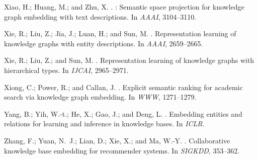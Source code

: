\documentclass[letterpaper]{article} \usepackage{aaai18}  \usepackage{times}  \usepackage{helvet}  \usepackage{courier}  \usepackage{url}  \usepackage{graphicx}  \usepackage{amsmath}
\begin{document}
\begin{thebibliography}{}
Xiao, H.; Huang, M.; and Zhu, X.
.
: Semantic space projection for knowledge graph embedding with
  text descriptions.
\newblock In {\em AAAI},  3104--3110.

Xie, R.; Liu, Z.; Jia, J.; Luan, H.; and Sun, M.
.
\newblock Representation learning of knowledge graphs with entity descriptions.
\newblock In {\em AAAI},  2659--2665.

Xie, R.; Liu, Z.; and Sun, M.
.
\newblock Representation learning of knowledge graphs with hierarchical types.
\newblock In {\em IJCAI},  2965--2971.

Xiong, C.; Power, R.; and Callan, J.
.
\newblock Explicit semantic ranking for academic search via knowledge graph
  embedding.
\newblock In {\em WWW},  1271--1279.

Yang, B.; Yih, W.-t.; He, X.; Gao, J.; and Deng, L.
.
\newblock Embedding entities and relations for learning and inference in
  knowledge bases.
\newblock In {\em ICLR}.

Zhang, F.; Yuan, N.~J.; Lian, D.; Xie, X.; and Ma, W.-Y.
.
\newblock Collaborative knowledge base embedding for recommender systems.
\newblock In {\em SIGKDD},  353--362.

\end{thebibliography}
\clearpage
{}
\end{document}
